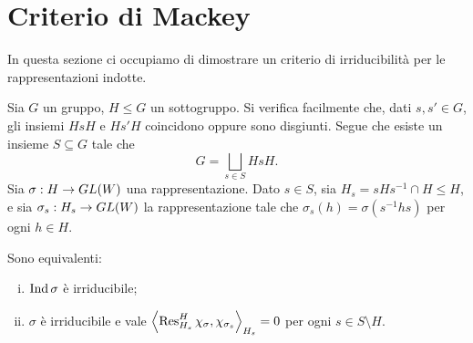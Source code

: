 \section{Criterio di Mackey}

In questa sezione ci occupiamo di dimostrare un criterio di irriducibilità per le rappresentazioni indotte.

Sia $G$ un gruppo, $H\le G$ un sottogruppo. Si verifica facilmente che, dati $s,s'\in G$, gli insiemi $HsH$ e $Hs'H$ coincidono oppure sono disgiunti. Segue che esiste un insieme $S\subseteq G$ tale che
$$
G=\bigsqcup_{s\in S}HsH.
$$
Sia $\sigma:H\to GL(W)$ una rappresentazione. Dato $s\in S$, sia $H_s=sHs^{-1}\cap H\le H$, e sia $\sigma_s:H_s\to GL(W)$ la rappresentazione tale che $\sigma_s(h)=\sigma(s^{-1}hs)$ per ogni $h\in H$.
\begin{proposition}
Sono equivalenti:
\begin{enumerate}[(i)]
\item $\operatorname{Ind}\sigma$ è irriducibile;
\item $\sigma$ è irriducibile e vale $\left\langle\operatorname{Res}_{H_s}^H\chi_\sigma,\chi_{\sigma_s}\right\rangle_{H_s}=0$ per ogni $s\in S\setminus H$.
\end{enumerate}
\end{proposition}
